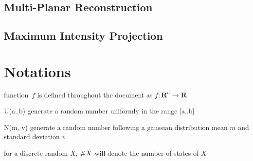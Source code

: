 \documentclass[11pt]{article}
\newcommand{\counta}[1]{\small{\#}#1}
\begin{document}
\subsection{Multi-Planar Reconstruction}
\subsection{Maximum Intensity Projection}

\section{Notations}
\begin{compactitem}
\item function~$f$ is defined throughout the document as $f \colon \textbf{R}^n \to \textbf{R}$
\item U(a..b) generate a random number uniformly in the range [a..b]
\item N(m, v) generate a random number following a gaussian distribution mean $m$ and standard deviation $v$
\item for a discrete random $X$, $\counta{X}$ will denote the number of states of $X$
\end{compactitem}

\printglossary



\end{document}
